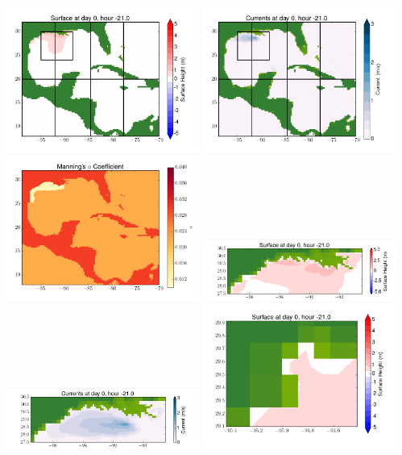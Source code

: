 \documentclass[11pt]{article}
\begin{document}
\vskip 10pt 
\includegraphics[width=0.475\textwidth]{frame0051fig1.png}
\includegraphics[width=0.475\textwidth]{frame0051fig2.png}
\vskip 10pt 
\includegraphics[width=0.475\textwidth]{frame0051fig3.png}
\includegraphics[width=0.475\textwidth]{frame0051fig4.png}
\vskip 10pt 
\includegraphics[width=0.475\textwidth]{frame0051fig5.png}
\includegraphics[width=0.475\textwidth]{frame0051fig6.png}
\end{document}
